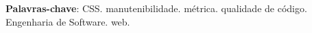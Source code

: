 \begin{resumo}

\textbf{Palavras-chave}: CSS. manutenibilidade. métrica. qualidade de código. Engenharia de Software. web.

\end{resumo}
